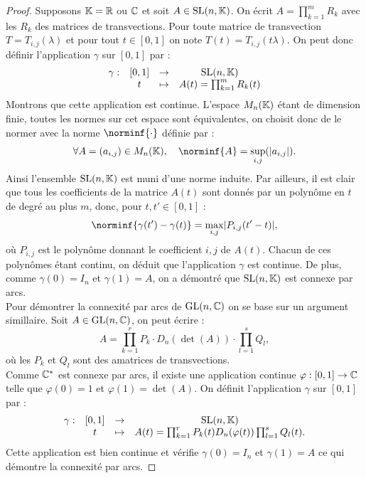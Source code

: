 \begin{proof}
Supposons $\mathbb{K} = \mathbb{R}$ ou $\mathbb{C}$ et soit $A \in \text{SL}(n,\mathbb{K})$. On écrit $A = \prod_{k=1}^m R_k$ avec les $R_k$ des matrices de transvections.
Pour toute matrice de transvection $T=T_{i,j}(\lambda)$ et pour tout $t \in [0,1]$ on note $T(t) = T_{i,j}(t \lambda)$.
On peut donc définir l'application $\gamma$ sur $[0,1]$ par :
\[ \begin{array}{c c c c}
\gamma : & [0,1] & \to & \text{SL}(n,\mathbb{K}) \\
& t & \mapsto & A(t) = \prod_{k=1}^m R_k(t) 
\end{array} \]
Montrons que cette application est continue. L'espace $M_{n}(\mathbb{K})$ étant de dimension finie, toutes les normes sur cet espace sont
équivalentes, on choisit donc de le normer avec la norme $\norminf{\cdot}$ définie par :
\[ \forall A=(a_{i,j}) \in \Mn, \quad \norminf{A} = \sup_{i,j}(\abs{a_{i,j}}) . \]
Ainsi l'ensemble $\text{SL}(n,\mathbb{K})$ est muni d'une norme induite. 
Par ailleurs, il est clair que tous les coefficients de la matrice $A(t)$ sont donnés par un polynôme en $t$ de degré au plus $m$,
donc, pour $t, t' \in [0,1]$ :
\[ \norminf{\gamma(t')-\gamma(t)} = \max_{i,j} \abs{P_{i,j}(t'-t)} , \]
où $P_{i,j}$ est le polynôme donnant le coefficient $i,j$ de $A(t)$.
Chacun de ces polynômes étant continu, on déduit que l'application $\gamma$ est continue.
De plus, comme $\gamma(0) = I_n$ et $\gamma(1) = A$, on a démontré que $\text{SL}(n,\mathbb{K})$ est connexe par arcs. \\

Pour démontrer la connexité par arcs de $\text{GL}(n ,\mathbb{C})$ on se base sur un argument simillaire.
Soit $A \in \text{GL}(n ,\mathbb{C})$, on peut écrire :
\[ A = \prod_{k=1}^r P_k \cdot D_n(\det(A)) \cdot \prod_{l=1}^s Q_l , \]
où les $P_k$ et $Q_l$ sont des amatrices de transvections. \\
Comme $\mathbb{C}^{\ast}$ est connexe par arcs, il existe une application continue $\varphi : [0,1] \to \mathbb{C}$ telle que $\varphi(0)=1$
et $\varphi(1)=\det(A)$. On définit l'application $\gamma$ sur $[0,1]$ par :
\[ \begin{array}{c c c c}
\gamma : & [0,1] & \to & \text{SL}(n,\mathbb{K}) \\
& t & \mapsto & A(t) = \prod_{k=1}^r P_k(t) D_n(\varphi(t)) \prod_{l=1}^s Q_l(t) .
\end{array} \]
Cette application est bien continue et vérifie $\gamma(0) = I_n$ et $\gamma(1)=A$ ce qui démontre la connexité par arcs.
\end{proof}

